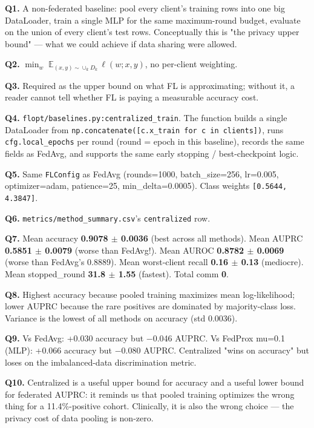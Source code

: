 \documentclass{article}
\begin{document}
\textbf{Q1.} A non-federated baseline: pool every client's training rows into one big DataLoader, train a single MLP for the same maximum-round budget, evaluate on the union of every client's test rows. Conceptually this is "the privacy upper bound" --- what we could achieve if data sharing were allowed.


\textbf{Q2.} \(\min_w \; \mathbb{E}_{(x,y) \sim \cup_k D_k} \, \ell(w; x, y)\), no per-client weighting.


\textbf{Q3.} Required as the upper bound on what FL is approximating; without it, a reader cannot tell whether FL is paying a measurable accuracy cost.


\textbf{Q4.} \texttt{flopt/baselines.py:centralized\_train}. The function builds a single DataLoader from \texttt{np.concatenate([c.x\_train for c in clients])}, runs \texttt{cfg.local\_epochs} per round (round = epoch in this baseline), records the same fields as FedAvg, and supports the same early stopping / best-checkpoint logic.


\textbf{Q5.} Same \texttt{FLConfig} as FedAvg (rounds=1000, batch\_size=256, lr=0.005, optimizer=adam, patience=25, min\_delta=0.0005). Class weights \texttt{[0.5644, 4.3847]}.


\textbf{Q6.} \texttt{metrics/method\_summary.csv}'s \texttt{centralized} row.


\textbf{Q7.} Mean accuracy \textbf{0.9078 \ensuremath{\pm} 0.0036} (best across all methods). Mean AUPRC \textbf{0.5851 \ensuremath{\pm} 0.0079} (worse than FedAvg!). Mean AUROC \textbf{0.8782 \ensuremath{\pm} 0.0069} (worse than FedAvg's 0.8889). Mean worst-client recall \textbf{0.16 \ensuremath{\pm} 0.13} (mediocre). Mean stopped\_round \textbf{31.8 \ensuremath{\pm} 1.55} (fastest). Total comm \textbf{0}.


\textbf{Q8.} Highest accuracy because pooled training maximizes mean log-likelihood; lower AUPRC because the rare positives are dominated by majority-class loss. Variance is the lowest of all methods on accuracy (std 0.0036).


\textbf{Q9.} Vs FedAvg: +0.030 accuracy but \ensuremath{-}0.046 AUPRC. Vs FedProx mu=0.1 (MLP): +0.066 accuracy but \ensuremath{-}0.080 AUPRC. Centralized "wins on accuracy" but loses on the imbalanced-data discrimination metric.


\textbf{Q10.} Centralized is a useful upper bound for accuracy and a useful lower bound for federated AUPRC: it reminds us that pooled training optimizes the wrong thing for a 11.4\%-positive cohort. Clinically, it is also the wrong choice --- the privacy cost of data pooling is non-zero.
\end{document}
